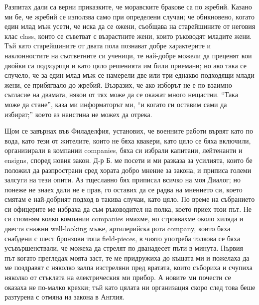 \documentclass[12pt]{book}
\begin{document}
Разпитах дали са верни приказките, че моравските бракове са по жребий. Казано ми бе, че жребий се използва само при определени случаи; че обикновено, когато един млад мъж усети, че иска да се ожени, съобщава на старейшините от неговия клас class, които се съветват с възрастните жени, които ръководят младите жени. Тъй като старейшините от двата пола познават добре характерите и наклонностите на съответните си ученици, те най-добре можели да преценят кои двойки са подходящи и като цяло решенията им били приемани; но ако така се случело, че за един млад мъж се намерели две или три еднакво подходящи млади жени, се прибягвало до жребий. Възразих, че ако изборът не е по взаимно съгласие на двамата, някои от тях може да се окажат много нещастни. “Така може да стане”, каза ми информаторът ми, “и когато ги оставим сами да избират;” което аз наистина не можех да отрека. 

Щом се завърнах във Филаделфия, установих, че военните работи вървят като по вода, като тези от жителите, които не бяха квакери, като цяло се бяха включили, организирали в компании companies, бяха си избрали капитани, лейтенанти и ensigns, според новия закон. Д-р Б. ме посети и ми разказа за усилията, които бе положил да разпространи сред хората добро мнение за закона, и приписа големи залсуги на тези опити. Аз тщеславно бях приписал всичко на моя Диалог; но понеже не знаех дали не е прав, го оставих да се радва на мнението си, което смятам е най-добрият подход в такива случаи, като цяло. По време на събранието си офицерите ме избраха да съм ръководител на полка, което приех този път. Не си спомням колко компании companies имахме, но строявахме около хиляда и двеста снажни well-looking мъже, артилерийска рота company, които бяха снабдени с шест бронзови топа field-pieces, в чиято употреба толкова се бяха усъвършенствали, че можеха да стрелят по дванадесет пъти в минута. Първия път когато прегледах моята заст, те ме придружиха до къщата ми и пожелаха да ме поздравят с няколко залпа изстреляни пред вратата, които събориха и счупиха няколко от стъклата на електрическия ми прибор. А новите ми почести се оказаха не по-малко крехки; тъй като цялата ни организация скоро след това беше разтурена с отмяна на закона в Англия. 
\end{document}
